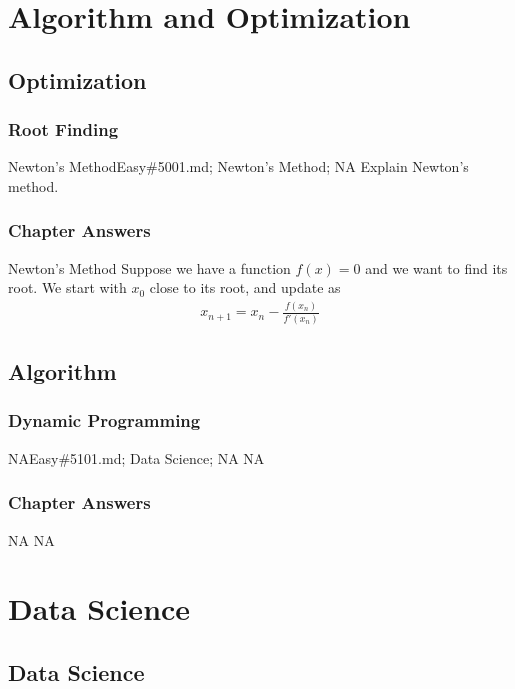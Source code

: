 \documentclass[oldfontcommands]{memoir}
\begin{document}
{\part{Algorithm and Optimization}
\chapter{Optimization}
\minitoc
\section{Root Finding}
\begin{question}{Newton's Method}{Easy}{\#5001.md; Newton's Method; NA}
Explain Newton's method.

\end{question}

\newpage\section{Chapter Answers}\begin{answer}{Newton's Method}
Suppose we have a function $f(x) = 0$ and we want to find its root. We start with $x_0$ close to its root, and update as
\begin{align}
    x_{n+1} = x_n - \frac{f(x_n)}{f'(x_n)}
\end{align}
\end{answer}
\chapter{Algorithm}
\minitoc
\section{Dynamic Programming}
\begin{question}{NA}{Easy}{\#5101.md; Data Science; NA}
NA

\end{question}

\newpage\section{Chapter Answers}\begin{answer}{NA}
NA
\end{answer}
\part{Data Science}
\chapter{Data Science}
\minitoc
}
\end{document}
